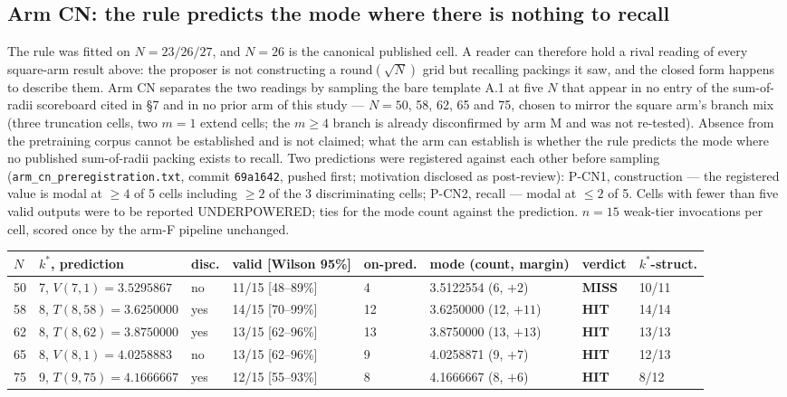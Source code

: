 \subsection{Arm CN: the rule predicts the mode where there is nothing to recall}

The rule was fitted on $N = 23/26/27$, and $N = 26$ is the canonical published cell. A
reader can therefore hold a rival reading of every square-arm result above: the proposer is
not constructing a $\mathrm{round}(\sqrt{N})$ grid but recalling packings it saw, and the
closed form happens to describe them. Arm CN separates the two readings by sampling the
bare template A.1 at five $N$ that appear in no entry of the sum-of-radii scoreboard cited
in \S7 and in no prior arm of this study --- $N = 50$, 58, 62, 65 and 75, chosen to mirror
the square arm's branch mix (three truncation cells, two $m = 1$ extend cells; the $m \ge 4$
branch is already disconfirmed by arm M and was not re-tested). Absence from the pretraining
corpus cannot be established and is not claimed; what the arm can establish is whether the
rule predicts the mode where no published sum-of-radii packing exists to recall. Two
predictions were registered against each other before sampling
(\texttt{arm\_cn\_preregistration.txt}, commit \texttt{69a1642}, pushed first; motivation
disclosed as post-review): P-CN1, construction --- the registered value is modal at $\ge 4$
of 5 cells including $\ge 2$ of the 3 discriminating cells; P-CN2, recall --- modal at
$\le 2$ of 5. Cells with fewer than five valid outputs were to be reported UNDERPOWERED;
ties for the mode count against the prediction. $n = 15$ weak-tier invocations per cell,
scored once by the arm-F pipeline unchanged.

\begin{center}
\begin{footnotesize}
\setlength{\tabcolsep}{4pt}
\begin{tabular}{llllllll}
\toprule
$N$ & $k^*$, prediction & disc. & valid [Wilson 95\%] & on-pred. & mode (count, margin) & verdict & $k^*$-struct. \\
\midrule
50 & 7, $V(7,1) = 3.5295867$ & no & 11/15 [48--89\%] & 4 & 3.5122554 (6, $+2$) & \textbf{MISS} & 10/11 \\
58 & 8, $T(8,58) = 3.6250000$ & yes & 14/15 [70--99\%] & 12 & 3.6250000 (12, $+11$) & \textbf{HIT} & 14/14 \\
62 & 8, $T(8,62) = 3.8750000$ & yes & 13/15 [62--96\%] & 13 & 3.8750000 (13, $+13$) & \textbf{HIT} & 13/13 \\
65 & 8, $V(8,1) = 4.0258883$ & no & 13/15 [62--96\%] & 9 & 4.0258871 (9, $+7$) & \textbf{HIT} & 12/13 \\
75 & 9, $T(9,75) = 4.1666667$ & yes & 12/15 [55--93\%] & 8 & 4.1666667 (8, $+6$) & \textbf{HIT} & 8/12 \\
\bottomrule
\end{tabular}
\end{footnotesize}
\end{center}

